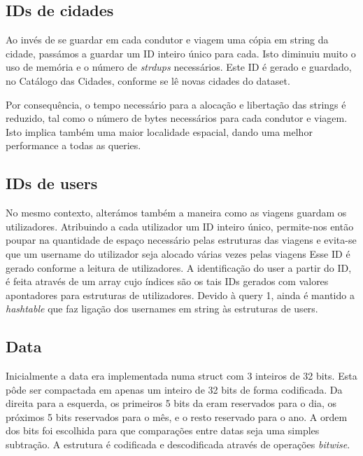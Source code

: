 \documentclass{article}
\begin{document}
        \subsection{IDs de cidades}
            Ao invés de se guardar em cada condutor e viagem uma cópia em string da cidade,
            passámos a guardar um ID inteiro único para cada. 
            Isto diminuiu muito o uso de memória e o número de \emph{strdups} necessários.
            Este ID é gerado e guardado, no Catálogo das Cidades, conforme se lê novas cidades do dataset.
            
            Por consequência, o tempo necessário para a alocação e libertação
            das strings é reduzido, tal como o número de bytes necessários para cada condutor e viagem.
            Isto implica também uma maior localidade espacial, dando uma melhor performance
            a todas as queries.
        \subsection{IDs de users}
            No mesmo contexto, alterámos também a maneira como as viagens guardam os utilizadores.
            Atribuindo a cada utilizador um ID inteiro único, permite-nos então poupar na quantidade de espaço necessário
            pelas estruturas das viagens e evita-se que um username do utilizador seja alocado várias vezes pelas viagens
            Esse ID é gerado conforme a leitura de utilizadores. 
            A identificação do user a partir do ID, é feita através de um array cujo índices são os tais IDs gerados
            com valores apontadores para estruturas de utilizadores.
            Devido à query 1, ainda é mantido a \textit{hashtable} que faz ligação dos usernames em string às estruturas de users.
        \subsection{Data}
            Inicialmente a data era implementada numa struct com 3 inteiros de 32 bits.
            Esta pôde ser compactada em apenas um inteiro de 32 bits de forma codificada.
            Da direita para a esquerda, os primeiros 5 bits da eram reservados para o dia, os próximos 5 bits
            reservados para o mês, e o resto reservado para o ano. A ordem dos bits
            foi escolhida para que comparações entre datas seja uma simples subtração.
            A estrutura é codificada e descodificada através de operações \textit{bitwise}.
            
\end{document}
